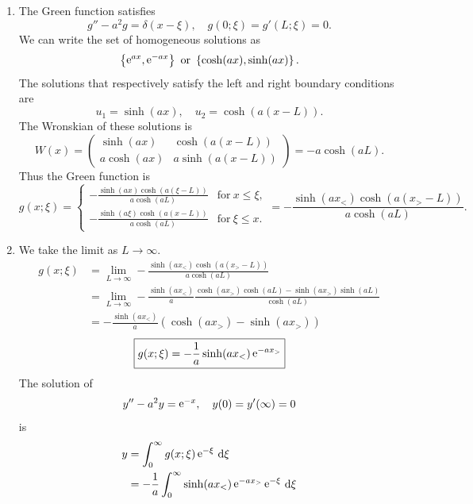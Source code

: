 {%
\begin{Solution}
  \label{solution y-a2y=f}
  \begin{enumerate}
  \item
    The Green function satisfies
    \[
    g'' - a^2 g = \delta(x - \xi), \quad g(0;\xi) = g'(L;\xi) = 0.
    \]
    We can write the set of homogeneous solutions as
    \[
    \left\{ \e^{a x}, \e^{-a x} \right\}\ \mathrm{or}\ 
    \left\{ \cosh(a x), \sinh(a x) \right\}.
    \]
    The solutions that respectively satisfy the left and right boundary conditions 
    are
    \[
    u_1 = \sinh(a x), \quad u_2 = \cosh(a (x - L)).
    \]
    The Wronskian of these solutions is
    \[
    W(x) = 
    \begin{pmatrix}
      \sinh(a x) & \cosh(a(x-L)) \\
      a \cosh(a x) & a \sinh(a(x-L))
    \end{pmatrix}
    = -a \cosh(a L).
    \]
    Thus the Green function is
    \[
    \boxed{
      g(x;\xi) = 
      \begin{cases}
        - \frac{ \sinh(a x) \cosh(a (\xi-L)) }{ a \cosh(a L) } 
        &\mathrm{for}\ x \leq \xi, \\
        - \frac{ \sinh(a \xi) \cosh(a (x-L)) }{ a \cosh(a L) } 
        &\mathrm{for}\ \xi \leq x. 
      \end{cases}
      =
      - \frac{ \sinh(a x_<) \cosh(a (x_> -L)) }{ a \cosh(a L) }.
      }
    \]
  \item
    We take the limit as $L \to \infty$.
    \begin{align*}
      g(x;\xi)
      &= \lim_{L \to \infty} - \frac{ \sinh(a x_<) \cosh(a (x_> -L)) }
      { a \cosh(a L) } \\
      &= \lim_{L \to \infty} - \frac{ \sinh(a x_<) }{ a }
      \frac{ \cosh( a x_> ) \cosh( a L ) 
        - \sinh( a x_> ) \sinh( a L ) }{ \cosh(a L) } \\
      &= - \frac{ \sinh(a x_<) }{ a }
      ( \cosh( a x_> ) - \sinh( a x_> ) ) 
    \end{align*}
    \[
    \boxed{
      g(x;\xi) = - \frac{1}{a} \sinh(a x_<) \mathop{\mathrm{e}}\nolimits^{-a x_>} 
      }
    \]
    The solution of 
    \[
    y'' - a^2 y = \mathop{\mathrm{e}}\nolimits^{-x}, \quad y(0) = y'(\infty) = 0
    \]
    is
    \begin{align*}
      y       &= \int_0^\infty g(x;\xi) \e^{-\xi} \,\dd \xi \\
      &= - \frac{1}{a} \int_0^\infty \sinh(a x_<) \e^{-a x_>} \e^{-\xi} \,\dd \xi \\

\end{align*}
\end{enumerate}
\end{Solution}}
